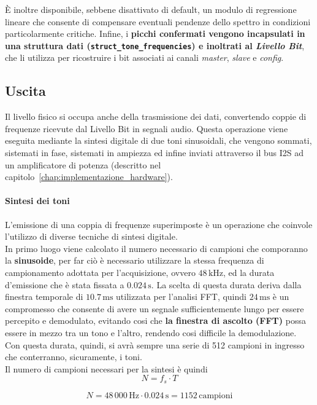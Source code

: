 È inoltre disponibile, sebbene disattivato di default, un modulo di regressione lineare che consente di compensare eventuali 
pendenze dello spettro in condizioni particolarmente critiche. Infine, i \textbf{picchi confermati vengono incapsulati in una struttura dati (\texttt{struct\_tone\_frequencies})
 e inoltrati al \emph{Livello Bit}}, che li utilizza per ricostruire i bit associati ai canali \emph{master}, \emph{slave} e \emph{config}.
\subsection{Uscita}
Il livello fisico si occupa anche della trasmissione dei dati, convertendo coppie di frequenze ricevute dal Livello Bit in segnali audio.
Questa operazione viene eseguita mediante la sintesi digitale di due toni sinusoidali, che vengono sommati, sistemati in fase, sistemati in ampiezza
ed infine inviati attraverso il bus I2S ad un amplificatore di potenza (descritto nel capitolo~\ref{chap:implementazione_hardware}).

\paragraph{Sintesi dei toni}
L'emissione di una coppia di frequenze superimposte è un operazione che coinvole l'utilizzo di diverse tecniche di sintesi digitale.\\
In primo luogo viene calcolato il numero necessario di campioni che comporanno la \textbf{sinusoide}, 
per far ciò è necessario utilizzare la stessa frequenza di campionamento adottata per l'acquisizione, ovvero $48\,\text{kHz}$, ed la durata d'emissione che
è stata fissata a $0.024\,\text{s}$.
La scelta di questa durata deriva dalla finestra temporale di $10.7\,\text{ms}$ utilizzata per l'analisi FFT, quindi $24\,\text{ms}$ 
è un compromesso che consente di avere un segnale sufficientemente lungo per essere percepito e demodulato, evitando cosi che \textbf{la finestra di ascolto (FFT)}
possa essere in mezzo tra un tono e l'altro, rendendo cosi difficile la demodulazione.
Con questa durata, quindi, si avrà sempre una serie di 512 campioni in ingresso che conterranno, sicuramente, i toni.\\

Il numero di campioni necessari per la sintesi è quindi 
\begin{equation}
    N = f_s \cdot T
    \end{equation}
    
    \begin{equation}
    N = 48\,000 \,\text{Hz} \cdot 0.024 \,\text{s} = 1152 \,\text{campioni}
    \end{equation}

